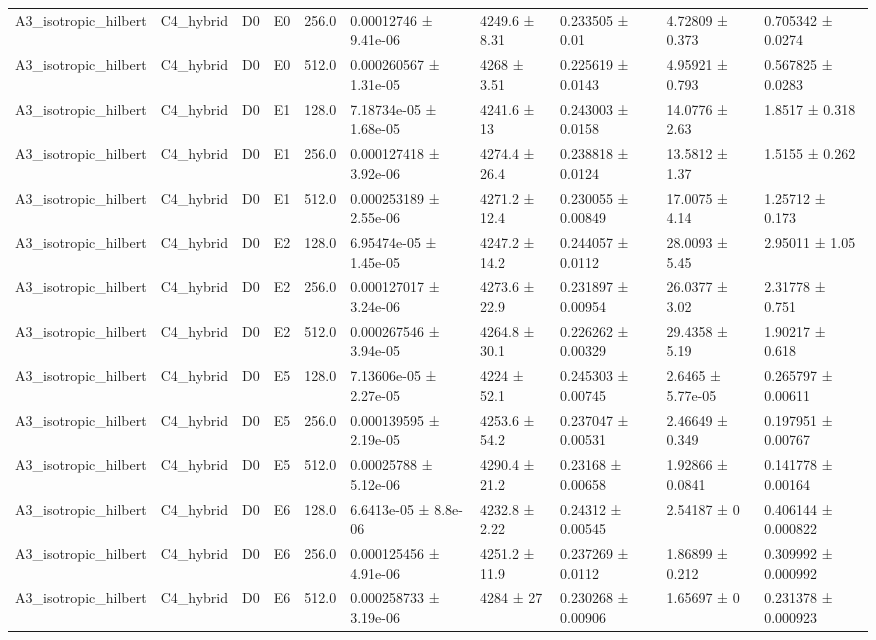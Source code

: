 \begin{table}
\begin{tabular}{llllllllll}
A3\_isotropic\_hilbert & C4\_hybrid & D0 & E0 & 256.0 & 0.00012746 ± 9.41e-06 & 4249.6 ± 8.31 & 0.233505 ± 0.01 & 4.72809 ± 0.373 & 0.705342 ± 0.0274 \\
A3\_isotropic\_hilbert & C4\_hybrid & D0 & E0 & 512.0 & 0.000260567 ± 1.31e-05 & 4268 ± 3.51 & 0.225619 ± 0.0143 & 4.95921 ± 0.793 & 0.567825 ± 0.0283 \\
A3\_isotropic\_hilbert & C4\_hybrid & D0 & E1 & 128.0 & 7.18734e-05 ± 1.68e-05 & 4241.6 ± 13 & 0.243003 ± 0.0158 & 14.0776 ± 2.63 & 1.8517 ± 0.318 \\
A3\_isotropic\_hilbert & C4\_hybrid & D0 & E1 & 256.0 & 0.000127418 ± 3.92e-06 & 4274.4 ± 26.4 & 0.238818 ± 0.0124 & 13.5812 ± 1.37 & 1.5155 ± 0.262 \\
A3\_isotropic\_hilbert & C4\_hybrid & D0 & E1 & 512.0 & 0.000253189 ± 2.55e-06 & 4271.2 ± 12.4 & 0.230055 ± 0.00849 & 17.0075 ± 4.14 & 1.25712 ± 0.173 \\
A3\_isotropic\_hilbert & C4\_hybrid & D0 & E2 & 128.0 & 6.95474e-05 ± 1.45e-05 & 4247.2 ± 14.2 & 0.244057 ± 0.0112 & 28.0093 ± 5.45 & 2.95011 ± 1.05 \\
A3\_isotropic\_hilbert & C4\_hybrid & D0 & E2 & 256.0 & 0.000127017 ± 3.24e-06 & 4273.6 ± 22.9 & 0.231897 ± 0.00954 & 26.0377 ± 3.02 & 2.31778 ± 0.751 \\
A3\_isotropic\_hilbert & C4\_hybrid & D0 & E2 & 512.0 & 0.000267546 ± 3.94e-05 & 4264.8 ± 30.1 & 0.226262 ± 0.00329 & 29.4358 ± 5.19 & 1.90217 ± 0.618 \\
A3\_isotropic\_hilbert & C4\_hybrid & D0 & E5 & 128.0 & 7.13606e-05 ± 2.27e-05 & 4224 ± 52.1 & 0.245303 ± 0.00745 & 2.6465 ± 5.77e-05 & 0.265797 ± 0.00611 \\
A3\_isotropic\_hilbert & C4\_hybrid & D0 & E5 & 256.0 & 0.000139595 ± 2.19e-05 & 4253.6 ± 54.2 & 0.237047 ± 0.00531 & 2.46649 ± 0.349 & 0.197951 ± 0.00767 \\
A3\_isotropic\_hilbert & C4\_hybrid & D0 & E5 & 512.0 & 0.00025788 ± 5.12e-06 & 4290.4 ± 21.2 & 0.23168 ± 0.00658 & 1.92866 ± 0.0841 & 0.141778 ± 0.00164 \\
A3\_isotropic\_hilbert & C4\_hybrid & D0 & E6 & 128.0 & 6.6413e-05 ± 8.8e-06 & 4232.8 ± 2.22 & 0.24312 ± 0.00545 & 2.54187 ± 0 & 0.406144 ± 0.000822 \\
A3\_isotropic\_hilbert & C4\_hybrid & D0 & E6 & 256.0 & 0.000125456 ± 4.91e-06 & 4251.2 ± 11.9 & 0.237269 ± 0.0112 & 1.86899 ± 0.212 & 0.309992 ± 0.000992 \\
A3\_isotropic\_hilbert & C4\_hybrid & D0 & E6 & 512.0 & 0.000258733 ± 3.19e-06 & 4284 ± 27 & 0.230268 ± 0.00906 & 1.65697 ± 0 & 0.231378 ± 0.000923 \\

\end{tabular}
\end{table}

